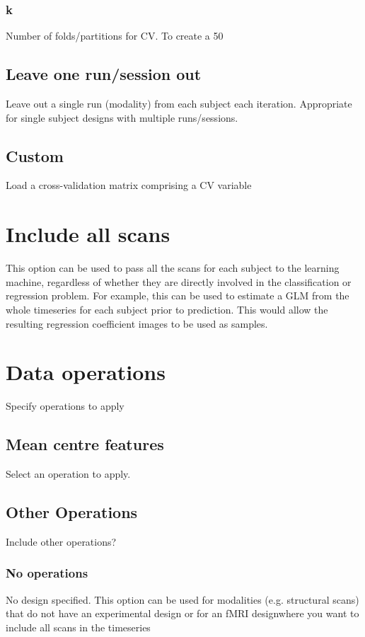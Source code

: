 \subsubsection{k}
Number of folds/partitions for CV. To create a 50%


\subsection{Leave one run/session out}
Leave out a single run (modality) from each subject each iteration. Appropriate for single subject designs with multiple runs/sessions.


\subsection{Custom}
Load a cross-validation matrix comprising a CV variable


\section{Include all scans}
This option can be used to pass all the scans for each subject to the learning machine, regardless of whether they are directly involved in the classification or regression problem. For example, this can be used to estimate a GLM from the whole timeseries for each subject prior to prediction. This would allow the resulting regression coefficient images to be used as samples.


\section{Data operations}
Specify operations to apply


\subsection{Mean centre features}
Select an operation to apply.


\subsection{Other Operations}
Include other operations?


\subsubsection{No operations}
No design specified. This option can be used for modalities (e.g. structural scans) that do not have an experimental design or for an fMRI designwhere you want to include all scans in the timeseries


